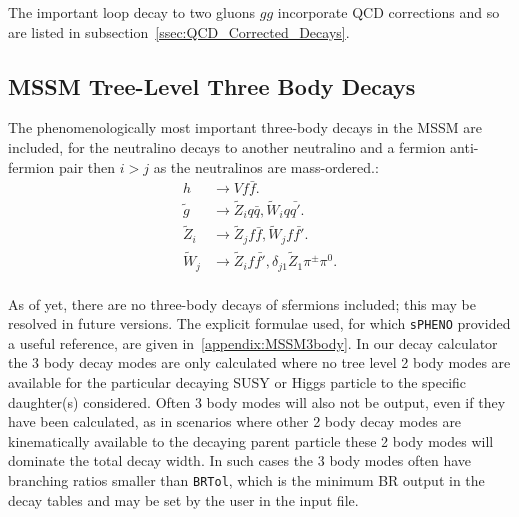 \documentclass[final,3p,times]{elsarticle}
\begin{document}
The important loop decay to two gluons $gg$ incorporate QCD corrections and so are listed in  subsection~\ref{ssec:QCD_Corrected_Decays}.

\subsection{MSSM Tree-Level Three Body Decays}
The phenomenologically most important three-body decays in the MSSM are included, for the neutralino decays to another neutralino and a fermion anti-fermion pair then $i>j$ as the neutralinos are mass-ordered.:
\begin{align*}
h &\rightarrow V f \bar{f}. \\
\tilde{g} &\rightarrow \tilde{Z}_i q \bar{q}, \tilde{W}_i q \bar{q'}. \\
\tilde{Z}_{i} &\rightarrow \tilde{Z}_j f \bar{f}, \tilde{W}_j f \bar{f'}. \\
\tilde{W}_{j} &\rightarrow \tilde{Z}_i f \bar{f'}, \delta_{j1} \tilde{Z}_1
                \pi^\pm \pi^0. \\
\end{align*}

As of yet, there are no three-body decays of sfermions included; this may be
resolved in future versions. The explicit formulae used, for which {\tt sPHENO}
\cite{Porod:2003um} provided a useful reference, are given in~\ref{appendix:MSSM3body}. In our decay calculator the 3 body decay modes
are only calculated where no tree level 2 body modes are available for the particular
decaying SUSY or Higgs particle to the specific daughter(s) considered. Often
3 body modes will also not be output, even if they have been calculated,
as in scenarios where other 2 body decay modes are kinematically available
to the decaying parent particle these 2 body modes will dominate the total
decay width. In such cases the 3 body modes often have branching ratios
smaller than {\tt BRTol}, which is the minimum BR output in the decay tables and may be
set by the user in the input file. 
\end{document}
